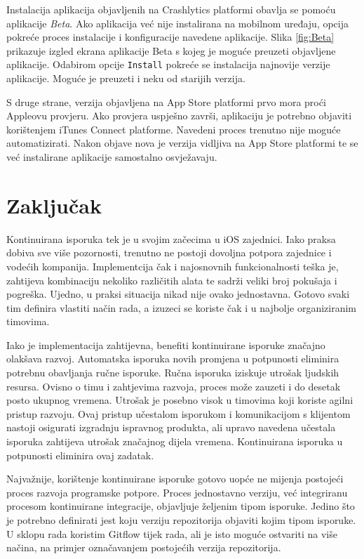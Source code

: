 \documentclass[times, utf8, diplomski, numeric]{fer}
\begin{document}
Instalacija aplikacija objavljenih na Crashlytics platformi obavlja se pomoću aplikacije \textit{Beta}. Ako aplikacija već nije instalirana na mobilnom uređaju, opcija pokreće proces instalacije i konfiguracije navedene aplikacije. Slika \ref{fig:Beta} prikazuje izgled ekrana aplikacije Beta s kojeg je moguće preuzeti objavljene aplikacije. Odabirom opcije \verb|Install| pokreće se instalacija najnovije verzije aplikacije. Moguće je preuzeti i neku od starijih verzija.

S druge strane, verzija objavljena na App Store platformi prvo mora proći Appleovu provjeru. Ako provjera uspješno završi, aplikaciju je potrebno objaviti korištenjem iTunes Connect platforme. Navedeni proces trenutno nije moguće automatizirati. Nakon objave nova je verzija vidljiva na App Store platformi te se već instalirane aplikacije samostalno osvježavaju.

\chapter{Zaključak}

Kontinuirana isporuka tek je u svojim začecima u iOS zajednici. Iako praksa dobiva sve više pozornosti, trenutno ne postoji dovoljna potpora zajednice i vodećih kompanija. Implementcija čak i najosnovnih funkcionalnosti teška je, zahtijeva kombinaciju nekoliko različitih alata te sadrži veliki broj pokušaja i pogreška. Ujedno, u praksi situacija nikad nije ovako jednostavna. Gotovo svaki tim definira vlastiti način rada, a izuzeci se koriste čak i u najbolje organiziranim timovima.

Iako je implementacija zahtijevna, benefiti kontinuirane isporuke značajno olakšava razvoj. Automatska isporuka novih promjena u potpunosti eliminira potrebnu obavljanja ručne isporuke. Ručna isporuka iziskuje utrošak ljudskih resursa. Ovisno o timu i zahtjevima razvoja, proces može zauzeti i do desetak posto ukupnog vremena. Utrošak je posebno visok u timovima koji koriste agilni pristup razvoju. Ovaj pristup učestalom isporukom i komunikacijom s klijentom nastoji osigurati izgradnju ispravnog produkta, ali upravo navedena učestala isporuka zahtijeva utrošak značajnog dijela vremena. Kontinuirana isporuka u potpunosti eliminira ovaj zadatak.

Najvažnije, korištenje kontinuirane isporuke gotovo uopće ne mijenja postojeći proces razvoja programske potpore. Proces jednostavno verziju, već integriranu procesom kontinuirane integracije, objavljuje željenim tipom isporuke. Jedino što je potrebno definirati jest koju verziju repozitorija objaviti kojim tipom isporuke. U sklopu rada koristim Gitflow tijek rada, ali je isto moguće ostvariti na više načina, na primjer označavanjem postojećih verzija repozitorija.
\end{document}

